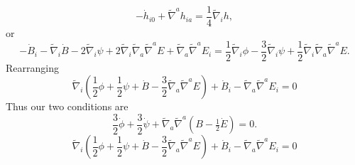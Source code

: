 \documentclass[10pt,letterpaper]{article}
\numberwithin{equation}{subsection}
\begin{document}
\begin{equation}
-\dot h_{i0} + \tilde\nabla^a h_{ia} = \frac14 \tilde\nabla_i h,
\end{equation}
or
\begin{equation}
-\dot B_i - \tilde\nabla_i \dot B -2 \tilde\nabla_i \psi + 2 \tilde\nabla_i  \tilde{\nabla}_{a}\tilde{\nabla}^{a}E + \tilde{\nabla}_{a}\tilde{\nabla}^{a} E_i
= \frac12 \tilde\nabla_i \phi - \frac32 \tilde\nabla_i \psi + \frac12  \tilde\nabla_i\tilde{\nabla}_{a}\tilde{\nabla}^{a} E.
\end{equation}
Rearranging
\begin{equation}
 \tilde\nabla_i \left( \frac12 \phi + \frac12  \psi + \dot B-\frac32   \tilde{\nabla}_{a}\tilde{\nabla}^{a} E \right) + \dot B_i -   \tilde{\nabla}_{a}\tilde{\nabla}^{a}E_i =0
\end{equation}
Thus our two conditions are
\begin{equation}
\frac32 \dot \phi + \frac32 \dot \psi +  \tilde{\nabla}_{a}\tilde{\nabla}^{a}( B - \tfrac12 \dot E) = 0.
\end{equation}
\begin{equation}
 \tilde\nabla_i \left( \frac12 \phi + \frac12  \psi + \dot B-\frac32   \tilde{\nabla}_{a}\tilde{\nabla}^{a} E \right) + \dot B_i -   \tilde{\nabla}_{a}\tilde{\nabla}^{a}E_i =0
\end{equation}
\end{document}
